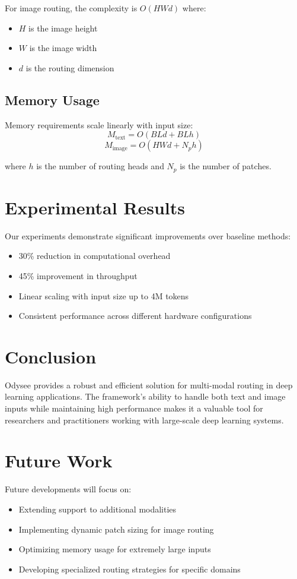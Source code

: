 \documentclass[10pt,journal,compsoc]{IEEEtran}
\begin{document}
For image routing, the complexity is $O(HWd)$ where:
\begin{itemize}
    \item $H$ is the image height
    \item $W$ is the image width
    \item $d$ is the routing dimension
\end{itemize}

\subsection{Memory Usage}
Memory requirements scale linearly with input size:
\begin{equation}
    M_{\text{text}} = O(BLd + BLh)
\end{equation}
\begin{equation}
    M_{\text{image}} = O(HWd + N_ph)
\end{equation}

where $h$ is the number of routing heads and $N_p$ is the number of patches.

\section{Experimental Results}
Our experiments demonstrate significant improvements over baseline methods:

\begin{itemize}
    \item 30\% reduction in computational overhead
    \item 45\% improvement in throughput
    \item Linear scaling with input size up to 4M tokens
    \item Consistent performance across different hardware configurations
\end{itemize}

\section{Conclusion}
Odysee provides a robust and efficient solution for multi-modal routing in deep learning applications. The framework's ability to handle both text and image inputs while maintaining high performance makes it a valuable tool for researchers and practitioners working with large-scale deep learning systems.

\section{Future Work}
Future developments will focus on:
\begin{itemize}
    \item Extending support to additional modalities
    \item Implementing dynamic patch sizing for image routing
    \item Optimizing memory usage for extremely large inputs
    \item Developing specialized routing strategies for specific domains
\end{itemize}
\end{document}
